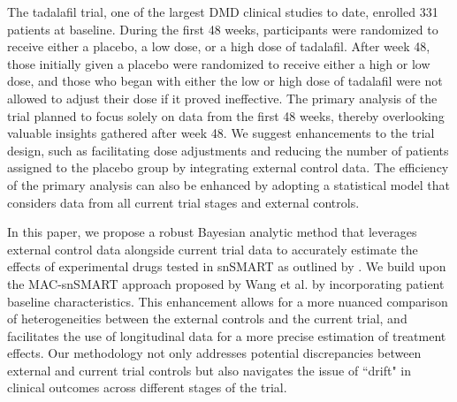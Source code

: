 The tadalafil trial, one of the largest \ac{DMD} clinical studies to date, enrolled 331 patients at baseline. During the first 48 weeks, participants were randomized to receive either a placebo, a low dose, or a high dose of tadalafil. After week 48, those initially given a placebo were randomized to receive either a high or low dose, and those who began with either the low or high dose of tadalafil were not allowed to adjust their dose if it proved ineffective. The primary analysis of the trial planned to focus solely on data from the first 48 weeks, thereby overlooking valuable insights gathered after week 48. We suggest enhancements to the trial design, such as facilitating dose adjustments and reducing the number of patients assigned to the placebo group by integrating external control data. The efficiency of the primary analysis can also be enhanced by adopting a statistical model that considers data from all current trial stages and external controls.

In this paper, we propose a robust Bayesian analytic method that leverages external control data alongside current trial data to accurately estimate the effects of experimental drugs tested in \ac{snSMART} as outlined by \cite{wang2023dynamic}. We build upon the MAC-snSMART approach proposed by Wang et al. by incorporating patient baseline characteristics. This enhancement allows for a more nuanced comparison of heterogeneities between the external controls and the current trial, and facilitates the use of longitudinal data for a more precise estimation of treatment effects. Our methodology not only addresses potential discrepancies between external and current trial controls but also navigates the issue of ``drift" in clinical outcomes across different stages of the trial.


